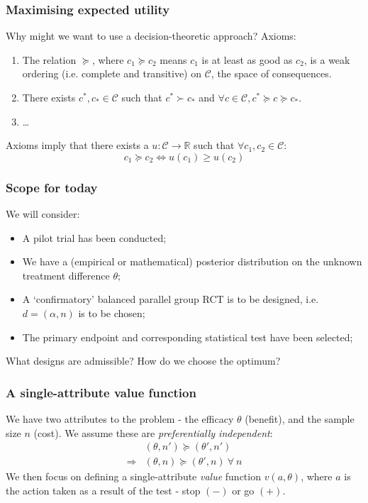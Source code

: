 \documentclass{beamer}
\begin{document}
\begin{frame}
\frametitle{Maximising expected utility}
Why might we want to use a decision-theoretic approach? Axioms:

\begin{enumerate}
\item The relation $\succeq$, where $c_{1} \succeq c_{2}$ means $c_{1}$ is at least as good as $c_{2}$, is a weak ordering (i.e. complete and transitive) on $\mathcal{C}$, the space of consequences.
\item There exists $c^{*}, c_{*} \in \mathcal{C}$ such that $c^{*} \succ c_{*}$ and $\forall c \in \mathcal{C}, c^{*} \succeq c \succeq c_{*}$.
\item \ldots
\end{enumerate}

Axioms imply that there exists a $u: \mathcal{C} \rightarrow \mathbb{R}$ such that $\forall c_{1}, c_{2} \in \mathcal{C}$:
\begin{equation}
c_{1} \succeq c_{2} \Leftrightarrow u(c_{1}) \geq u(c_{2})
\end{equation}
\end{frame}

\begin{frame}
\frametitle{Scope for today}
We will consider:
\begin{itemize}
\item A pilot trial has been conducted;
\item We have a (empirical or mathematical) posterior distribution on the unknown treatment difference $\theta$;
\item A `confirmatory' balanced parallel group RCT is to be designed, i.e. $d = (\alpha, n)$ is to be chosen;
\item The primary endpoint and corresponding statistical test have been selected;
\end{itemize}
What designs are admissible? How do we choose the optimum?
\end{frame}

\begin{frame}
\frametitle{A single-attribute value function}
We have two attributes to the problem - the efficacy $\theta$ (benefit), and the sample size $n$ (cost). We assume these are \emph{preferentially independent}:
\begin{align}
& (\theta, n') \succeq (\theta', n') \\
\Rightarrow  & (\theta, n) \succeq (\theta', n) ~ \forall ~ n
\end{align}
We then focus on defining a single-attribute \emph{value} function $v(a, \theta)$, where $a$ is the action taken as a result of the test - stop $(-)$ or go $(+)$.
\end{frame}
\end{document}
